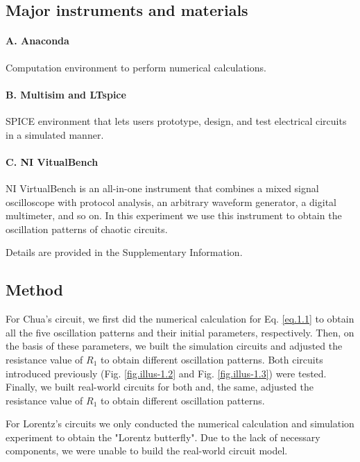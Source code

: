 \documentclass[10pt,a4paper,twocolumn,twoside,UTF8]{article}
\begin{document}
	\subsection{Major instruments and materials}

		\paragraph{A. Anaconda} Computation environment to perform numerical calculations.
		\paragraph{B. Multisim and LTspice} SPICE environment that lets users prototype, design, and test electrical circuits in a simulated manner.
		\paragraph{C. NI VitualBench} NI VirtualBench is an all-in-one instrument that combines a mixed signal oscilloscope with protocol analysis, an arbitrary waveform generator, a digital multimeter, and so on. 
		In this experiment we use this instrument to obtain the oscillation patterns of chaotic circuits.

		Details are provided in the Supplementary Information.
	\subsection{Method}
		
		For Chua's circuit, we first did the numerical calculation for Eq. \ref{eq.1.1} to obtain all the five oscillation patterns and their initial parameters, respectively. 
		Then, on the basis of these parameters, we built the simulation circuits and adjusted the resistance value of $R_1$ to obtain different oscillation patterns. 
		Both circuits introduced previously (Fig. \ref{fig.illus-1.2} and Fig. \ref{fig.illus-1.3}) were tested.
		Finally, we built real-world circuits for both and, the same, adjusted the resistance value of $R_1$ to obtain different oscillation patterns.

		For Lorentz's circuits we only conducted the numerical calculation and simulation experiment to obtain the "Lorentz butterfly".
		Due to the lack of necessary components, we were unable to build the real-world circuit model.


\end{document}
